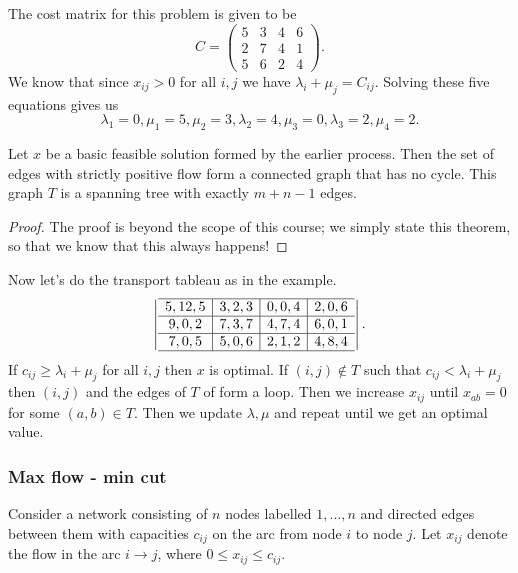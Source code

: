 \documentclass[egregdoesnotlikesansseriftitles,a4paper]{scrartcl}
\begin{document}
The cost matrix for this problem is given to be \[
C=\begin{pmatrix} 5&3&4&6\\2&7&4&1 \\5&6&2&4 \end{pmatrix}
.\] We know that since $x_{ij}>0$ for all $i,j$ we have $\lambda_{i}+\mu_{j}=C_{ij}$. Solving these five equations gives us \[
\lambda_1 =0, \mu_1 =5, \mu_2 =3, \lambda_2 =4, \mu_3 =0, \lambda_3 =2, \mu_4 =2
.\] 
\begin{theorem}
	 Let $x$ be a basic feasible solution formed by the earlier process. Then the set of edges with strictly positive flow form a connected graph that has no cycle. This graph $T$ is a spanning tree with exactly $m+n-1$ edges.
\end{theorem}
\begin{proof}
	 The proof is beyond the scope of this course; we simply state this theorem, so that we know that this always happens!
\end{proof}
Now let's do the transport tableau as in the example. 
\[
\left|
	\begin{array}{c|c|c|c}
		\hline
		5 , 12 , 5 & 3,2, 3& 0,0, 4& 2,0,6\\
		\hline
		9,0,2&7,3,7&4,7,4&6,0,1\\
		\hline
		7,0,5&5,0,6&2,1,2&4,8,4\\
		\hline
	\end{array}
\right|
.\] 
If $c_{ij} \geq \lambda_{i}+\mu_{j}$ for all $i,j$ then $x$ is optimal. If $(i,j) \notin T$ such that $c_{ij}<\lambda_{i}+\mu_{j}$ then $(i,j)$ and the edges of $T$ of form a loop. Then we increase $x_{ij}$ until $x_{ab}=0$ for some $(a,b) \in T$. Then we update $\lambda, \mu$ and repeat until we get an optimal value. 
\subsubsection{Max flow - min cut}
Consider a network consisting of $n$ nodes labelled $1, \ldots ,n$ and directed edges between them with capacities $c_{ij}$ on the arc from node $i$ to node $j$. Let $x_{ij}$ denote the flow in
the arc $i \rightarrow j$, where $0 \leq x_{ij} \leq c_{ij}.$
\end{document}
